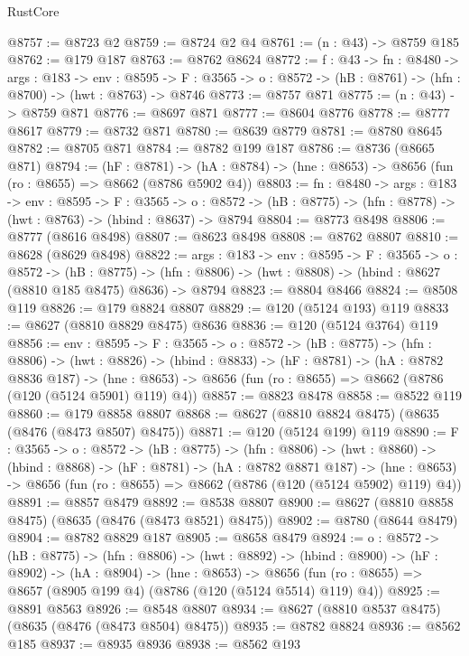 \begin{lexlean}{RustCore}
\begin{coremodule}
@8757 := @8723 @2
@8759 := @8724 @2 @4
@8761 := (n : @43) -> @8759 @185
@8762 := @179 @187
@8763 := @8762 @8624
@8772 := {f : @43} ->
  {fn : @8480} ->
  {args : @183} ->
  {env : @8595} ->
  {F : @3565} -> {o : @8572} -> (hB : @8761) -> (hfn : @8700) -> (hwt : @8763) -> @8746
@8773 := @8757 @871
@8775 := (n : @43) -> @8759 @871
@8776 := @8697 @871
@8777 := @8604 @8776
@8778 := @8777 @8617
@8779 := @8732 @871
@8780 := @8639 @8779
@8781 := @8780 @8645
@8782 := @8705 @871
@8784 := @8782 @199 @187
@8786 := @8736 (@8665 @871)
@8794 := (hF : @8781) ->
  (hA : @8784) -> (hne : @8653) -> @8656 (fun (ro : @8655) => @8662 (@8786 @5902 @4))
@8803 := {fn : @8480} ->
  {args : @183} ->
  {env : @8595} ->
  {F : @3565} ->
  {o : @8572} -> (hB : @8775) -> (hfn : @8778) -> (hwt : @8763) -> (hbind : @8637) -> @8794
@8804 := @8773 @8498
@8806 := @8777 (@8616 @8498)
@8807 := @8623 @8498
@8808 := @8762 @8807
@8810 := @8628 (@8629 @8498)
@8822 := {args : @183} ->
  {env : @8595} ->
  {F : @3565} ->
  {o : @8572} ->
  (hB : @8775) ->
  (hfn : @8806) -> (hwt : @8808) -> (hbind : @8627 (@8810 @185 @8475) @8636) -> @8794
@8823 := @8804 @8466
@8824 := @8508 @119
@8826 := @179 @8824 @8807
@8829 := @120 (@5124 @193) @119
@8833 := @8627 (@8810 @8829 @8475) @8636
@8836 := @120 (@5124 @3764) @119
@8856 := {env : @8595} ->
  {F : @3565} ->
  {o : @8572} ->
  (hB : @8775) ->
  (hfn : @8806) ->
  (hwt : @8826) ->
  (hbind : @8833) ->
  (hF : @8781) ->
  (hA : @8782 @8836 @187) ->
  (hne : @8653) -> @8656 (fun (ro : @8655) => @8662 (@8786 (@120 (@5124 @5901) @119) @4))
@8857 := @8823 @8478
@8858 := @8522 @119
@8860 := @179 @8858 @8807
@8868 := @8627 (@8810 @8824 @8475) (@8635 (@8476 (@8473 @8507) @8475))
@8871 := @120 (@5124 @199) @119
@8890 := {F : @3565} ->
  {o : @8572} ->
  (hB : @8775) ->
  (hfn : @8806) ->
  (hwt : @8860) ->
  (hbind : @8868) ->
  (hF : @8781) ->
  (hA : @8782 @8871 @187) ->
  (hne : @8653) -> @8656 (fun (ro : @8655) => @8662 (@8786 (@120 (@5124 @5902) @119) @4))
@8891 := @8857 @8479
@8892 := @8538 @8807
@8900 := @8627 (@8810 @8858 @8475) (@8635 (@8476 (@8473 @8521) @8475))
@8902 := @8780 (@8644 @8479)
@8904 := @8782 @8829 @187
@8905 := @8658 @8479
@8924 := {o : @8572} ->
  (hB : @8775) ->
  (hfn : @8806) ->
  (hwt : @8892) ->
  (hbind : @8900) ->
  (hF : @8902) ->
  (hA : @8904) ->
  (hne : @8653) ->
  @8656 (fun (ro : @8655) => @8657 (@8905 @199 @4) (@8786 (@120 (@5124 @5514) @119) @4))
@8925 := @8891 @8563
@8926 := @8548 @8807
@8934 := @8627 (@8810 @8537 @8475) (@8635 (@8476 (@8473 @8504) @8475))
@8935 := @8782 @8824
@8936 := @8562 @185
@8937 := @8935 @8936
@8938 := @8562 @193

\end{coremodule}
\end{lexlean}
